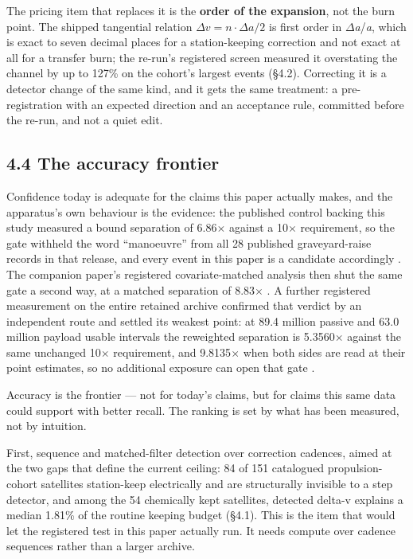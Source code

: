 \documentclass[11pt]{article}
\begin{document}
The pricing item that replaces it is the \textbf{order of the expansion}, not the burn point. The shipped tangential relation $\Delta v = n\cdot\Delta a/2$ is first order in $\Delta$\emph{a}/\emph{a}, which is exact to seven decimal places for a station-keeping correction and not exact at all for a transfer burn; the re-run's registered screen measured it overstating the channel by up to 127\% on the cohort's largest events (\S{}4.2). Correcting it is a detector change of the same kind, and it gets the same treatment: a pre-registration with an expected direction and an acceptance rule, committed before the re-run, and not a quiet edit.

\subsection*{4.4 The accuracy frontier}

Confidence today is adequate for the claims this paper actually makes, and the apparatus's own behaviour is the evidence: the published control backing this study measured a bound separation of 6.86$\times$ against a 10$\times$ requirement, so the gate withheld the word ``manoeuvre'' from all 28 published graveyard-raise records in that release, and every event in this paper is a candidate accordingly%
. The companion paper's registered covariate-matched analysis then shut the same gate a second way, at a matched separation of 8.83$\times$%
. A further registered measurement on the entire retained archive confirmed that verdict by an independent route and settled its weakest point: at 89.4 million passive and 63.0 million payload usable intervals the reweighted separation is 5.3560$\times$ against the same unchanged 10$\times$ requirement, and 9.8135$\times$ when both sides are read at their point estimates, so no additional exposure can open that gate%
.

Accuracy is the frontier --- not for today's claims, but for claims this same data could support with better recall. The ranking is set by what has been measured, not by intuition.

First, sequence and matched-filter detection over correction cadences, aimed at the two gaps that define the current ceiling: 84 of 151 catalogued propulsion-cohort satellites station-keep electrically and are structurally invisible to a step detector, and among the 54 chemically kept satellites, detected delta-v explains a median 1.81\% of the routine keeping budget (\S{}4.1). This is the item that would let the registered test in this paper actually run. It needs compute over cadence sequences rather than a larger archive.
\end{document}
